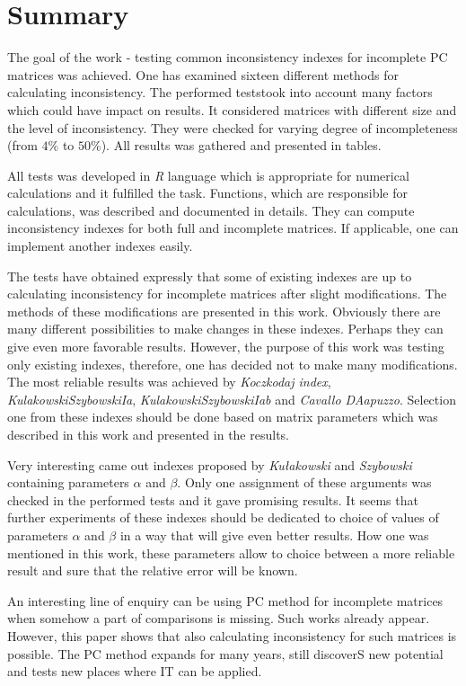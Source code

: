 \chapter{Summary}
\label{sec:summary}

The goal of the work - testing common inconsistency indexes for incomplete PC matrices was achieved. One has examined sixteen different methods for calculating inconsistency. The performed teststook into account many factors which could have impact on results. It considered matrices with different size and the level of inconsistency. They were checked for varying degree of incompleteness (from $4\%$ to $50\%$). All results was gathered and presented in tables.

All tests was developed in \textit{R} language which is appropriate for numerical calculations and it fulfilled the task. Functions, which are responsible for calculations, was described and documented in details. They can compute inconsistency indexes for both full and incomplete matrices. If applicable, one can implement another indexes easily.

The tests have obtained expressly that some of existing indexes are up to calculating inconsistency for incomplete matrices after slight modifications. The methods of these modifications are presented in this work. Obviously there are many different possibilities to make changes in these indexes. Perhaps they can give even more favorable results. However, the purpose of this work was testing only existing indexes, therefore, one has decided not to make many modifications. The most reliable results was achieved by \textit{Koczkodaj index}, \textit{KulakowskiSzybowskiIa}, \textit{KulakowskiSzybowskiIab} and \textit{Cavallo DAapuzzo}. Selection one from these indexes should be done based on matrix parameters which was described in this work and presented in the results.

Very interesting came out indexes proposed by \textit{Kułakowski} and \textit{Szybowski} containing parameters $\alpha$ and $\beta$. Only one assignment of these arguments was checked in the performed tests and it gave promising results. It seems that further experiments of these indexes should be dedicated to choice of values of parameters $\alpha$ and $\beta$ in a way that will give even better results. How one was mentioned in this work, these parameters allow to choice between a more reliable result and sure that the relative error will be known.

An interesting line of enquiry can be using PC method for incomplete matrices when somehow a part of comparisons is missing. Such works already appear. However, this paper shows that also calculating inconsistency for such matrices is possible. The PC method expands for many years, still discoverS new potential and tests new places where IT can be applied.